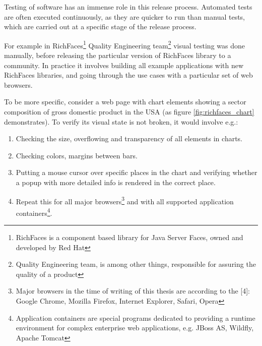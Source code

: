 \documentclass[11pt,oneside,final]{fithesis2}
\begin{document}
  Testing of software has an immense role in this release process. Automated tests are often executed continuously, as they are quicker to run than manual tests, 
  which are carried out at a specific stage of the release process.
  
  For example in RichFaces\footnote{RichFaces is a component based library for Java Server Faces, owned and developed by Red Hat} Quality Engineering 
  team\footnote{Quality Engineering team, is among other things, responsible for assuring the quality of a product} visual testing was done manually, before releasing 
  the particular version of RichFaces library to a community. In practice it involves building all example applications with new RichFaces libraries, and going
  through the use cases with a particular set of web browsers. 
  
  To be more specific, consider a web page with chart elements showing a sector composition of gross domestic product in the USA (as figure \ref{fig:richfaces_chart} demonstrates).
  To verify its visual state is not broken, it would involve e.g.:
  \begin{enumerate}
   \item Checking the size, overflowing and transparency of all elements in charts.
   \item Checking colors, margins between bars.
   \item Putting a mouse cursor over specific places in the chart and verifying whether a popup with more detailed info is rendered in the correct place.
   \item Repeat this for all major browsers\footnote{\label{footnote:majorBrowsers}Major browsers in the time of writing of this thesis are according to the [4]: Google Chrome, Mozilla Firefox, Internet Explorer, Safari, Opera} 
   and with all supported application containers\footnote{Application containers are special programs 
   dedicated to providing a runtime environment for complex enterprise web applications, e.g. JBoss AS, Wildfly, Apache Tomcat}.
  \end{enumerate}
  
\end{document}
